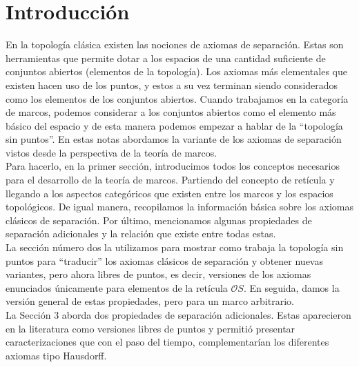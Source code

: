 \documentclass{comunicaciones}
\begin{document}


\maketitle

\section{Introducción}

\noindent 
En la topología clásica existen las nociones de axiomas de separación. Estas son herramientas que permite dotar a los espacios de una cantidad suficiente de conjuntos abiertos (elementos de la topología). Los axiomas más elementales que existen hacen uso de los puntos, y estos a su vez terminan siendo considerados como los elementos de los conjuntos abiertos. Cuando trabajamos en la categoría de marcos, podemos considerar a los conjuntos abiertos como el elemento más básico del espacio y de esta manera podemos empezar a hablar de la ``topología sin puntos''. En estas notas abordamos la variante de los axiomas de separación vistos desde la perspectiva de la teoría de marcos. \\

Para hacerlo, en la primer sección, introducimos todos los conceptos necesarios para el desarrollo de la teoría de marcos. Partiendo del concepto de retícula y llegando a los aspectos categóricos que existen entre los marcos y los espacios topológicos. De igual manera, recopilamos la información básica sobre los axiomas clásicos de separación. Por último, mencionamos algunas propiedades de separación adicionales y la relación que existe entre todas estas.\\

La sección número dos la utilizamos para mostrar como trabaja la topología sin puntos para ``traducir'' los axiomas clásicos de separación y obtener nuevas variantes, pero ahora libres de puntos, es decir, versiones de los axiomas enunciados únicamente para elementos de la retícula $\mathcal{O}S$. En seguida, damos la versión general de estas propiedades, pero para un marco arbitrario.\\

La Sección 3 aborda dos propiedades de separación adicionales. Estas aparecieron en la literatura como versiones libres de puntos y permitió presentar caracterizaciones que con el paso del tiempo, complementarían los diferentes axiomas tipo Hausdorff.\\
\end{document}
